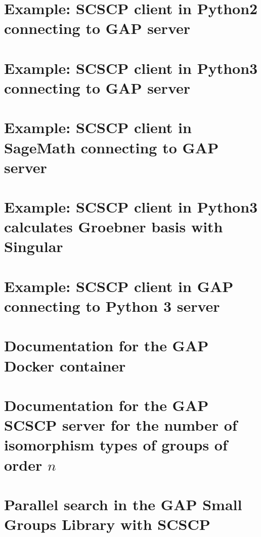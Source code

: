 \documentclass{deliverablereport}
\begin{document}
\printbibliography

\newpage
\appendix

\section{Example: SCSCP client in Python2 connecting to GAP server}\label{python2-to-GAP}


\section{Example: SCSCP client in Python3 connecting to GAP server}\label{python3-to-GAP}


\section{Example: SCSCP client in SageMath connecting to GAP server}\label{SageMath-to-GAP}


\section{Example: SCSCP client in Python3 calculates Groebner basis with Singular}\label{Python3sympy-to-GAP-Singular}


\section{Example: SCSCP client in GAP connecting to Python 3 server}\label{GAP-to-Python3numpy}


\section{Documentation for the GAP Docker container}\label{SCSCP-with-GAP-docker}


\section{Documentation for the GAP SCSCP server for the number of isomorphism types of groups of order $n$}\label{Gnu-SCSCP-server}


\section{Parallel search in the GAP Small Groups Library with SCSCP}
\label{Parallel-GAP-SCSCP}

\end{document}
